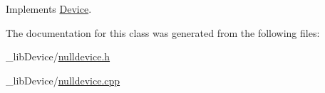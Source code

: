 Implements \hyperlink{class_device_aab20e3f9dc696c6a1153776d526dcc0b}{Device}.



The documentation for this class was generated from the following files\+:\begin{DoxyCompactItemize}
\item 
\+\_\+lib\+Device/\hyperlink{nulldevice_8h}{nulldevice.\+h}\item 
\+\_\+lib\+Device/\hyperlink{nulldevice_8cpp}{nulldevice.\+cpp}\end{DoxyCompactItemize}

